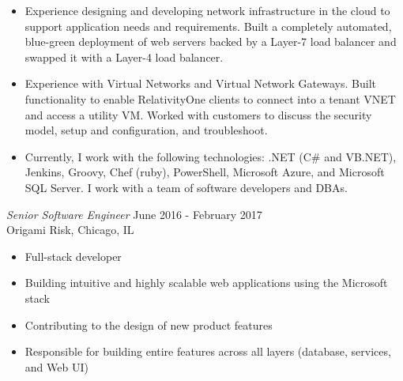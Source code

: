 \documentclass[margin]{res}
\newcommand{\tab}{\hspace*{2em}}
\begin{document}
\begin{resume}
\begin{itemize}
	\item Experience designing and developing network infrastructure in the cloud to support application needs and requirements. Built a completely automated, blue-green deployment of web servers backed by a Layer-7 load balancer and swapped it with a Layer-4 load balancer.
	\item Experience with Virtual Networks and Virtual Network Gateways. Built functionality to enable RelativityOne clients to connect into a tenant VNET and access a utility VM. Worked with customers to discuss the security model, setup and configuration, and troubleshoot.
	\item Currently, I work with the following technologies: .NET (C\# and VB.NET), Jenkins, Groovy, Chef (ruby), PowerShell, Microsoft Azure, and Microsoft SQL Server. I work with a team of software developers and DBAs.
			\end{itemize}

{\sl Senior Software Engineer} \hfill June 2016 - February 2017\\
	Origami Risk, Chicago, IL		\tab	\tab\tab\tab\tab\tab\tab\tab			
	\begin{itemize}  \itemsep -2pt %
	\item Full-stack developer
	\item Building intuitive and highly scalable web applications using the Microsoft stack
	\item Contributing to the design of new product features
	\item Responsible for building entire features across all layers (database, services, and Web UI)
			\end{itemize}


\end{resume}
\end{document}
